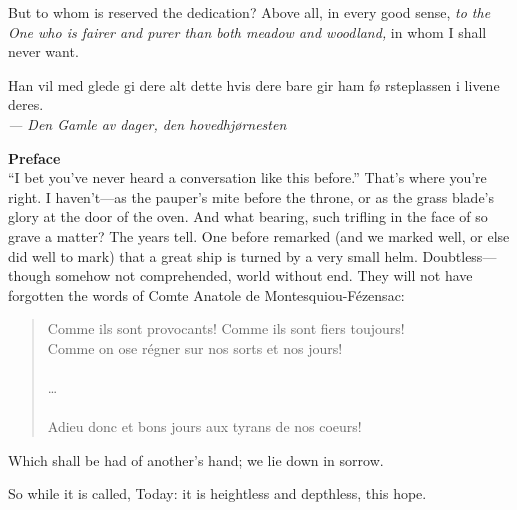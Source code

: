 But to whom is reserved the dedication? Above all, in every good
sense, \emph{to the One who is fairer and purer than both meadow and
  woodland,} in whom I shall never want.

\newpage

\begin{flushright}
\begin{minipage}[]{0.55\linewidth}
    \begin{flushright}
      Han vil med glede gi dere alt dette hvis dere bare gir ham f\o
      rsteplassen i livene deres.  \\{\small \emph{--- Den Gamle av
          dager, den hovedhj\o rnesten} }
    \end{flushright}
\end{minipage}
\end{flushright}

{\Huge \bf Preface} \\

``I bet you've never heard a conversation like this before.'' That's
where you're right. I haven't---as the pauper's mite before the
throne, or as the grass blade's glory at the door of the
oven. And what bearing, such trifling in the face of so grave a
matter?  The years tell.  One before remarked (and we marked well, or
else did well to mark) that a great ship is turned by a very small
helm. Doubtless---though somehow not comprehended, world without
end. They will not have forgotten the words of Comte Anatole de
Montesquiou-F\'{e}zensac:

\begin{quote} 
\begin{spacing}{1.1}
Comme ils sont provocants! Comme ils sont fiers toujours! \\
Comme on ose r\'{e}gner sur nos sorts et nos jours! \\
\\
\dots \\
\\
Adieu donc et bons jours aux tyrans de nos coeurs! \\
\end{spacing}
\end{quote}
Which shall be had of another's hand; we lie down in sorrow.

So while it is called, Today: it is heightless and depthless, this hope.


